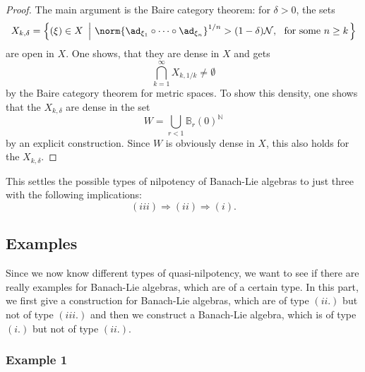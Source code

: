 \documentclass[
11pt,                          %
english                        %
]{article}
\begin{document}
\begin{proof}
	The main argument is the Baire category theorem: for $\delta > 0$, the sets
	\begin{equation*}
		X_{k, \delta}
		=
		\left\{
			(\xi) \in X
		\ \left| \
			\norm{ \ad_{\xi_1} \circ \cdots \circ \ad_{\xi_n} }^{1/n}
			>
			(1 - \delta) \mathcal{N}
			, \
			\text{ for some }
			n \geq k	
		\right.
		\right\}
	\end{equation*}
	are open in $X$. One shows, that they are dense in $X$ and gets
	\begin{equation*}
		\bigcap\limits_{k = 1}^\infty
		X_{k, 1/k}
		\neq
		\emptyset
	\end{equation*}
	by the Baire category theorem for metric spaces. To show this density,
	one shows that the $X_{k, \delta}$ are dense in the set
	\begin{equation*}
		W 
		=
		\bigcup\limits_{r < 1}
		\mathbb{B}_r(0)^{\mathbb{N}}
	\end{equation*}
	by an explicit construction. Since $W$ is obviously dense in $X$, this also 
	holds for the $X_{k, \delta}$.
\end{proof}
This settles the possible types of nilpotency of Banach-Lie algebras to just three 
with the following implications:
\begin{equation}
	\label{nilpotencytypes}
	(iii) \Longrightarrow (ii) \Longrightarrow (i).
\end{equation}



\subsection{Examples}

Since we now know different types of quasi-nilpotency, we want to see if there are 
really examples for Banach-Lie algebras, which are of a certain type. In this part, 
we first give a construction for Banach-Lie algebras, which are of type $(ii.)$ but 
not of type $(iii.)$ and then we construct a Banach-Lie algebra, which is of type 
$(i.)$ but not of type $(ii.)$.



\subsubsection{Example 1}
\end{document}
